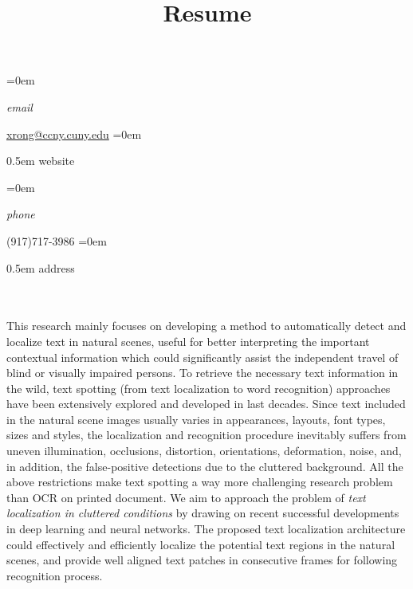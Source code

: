 \documentclass{scrartcl}
\date{}
\title{Resume}
\newlength{\datebox}\settowidth{\datebox}{Spring 2014} %
\newcommand{\NewEntry}[3]{\noindent\hangindent=0em\hangafter=0 \parbox{\datebox}{\small \textit{#1}}\hspace{1.5em} #2 #3 %
\vspace{0.5em}} %
\begin{document}
\thispagestyle{empty} %


\begin{cv}{}\vspace{2.0em} %


\NewEntry{email}{\href{mailto:xrong@ccny.cuny.edu}{xrong@ccny.cuny.edu}} %

\NewEntry{website}{\href{http://xrong.org}{http://xrong.org}} %

\NewEntry{phone}{(917)717-3986} %

\NewEntry{address}{Steinman Hall ST512, 160 Convent Avenue, New York, NY 10031} %

\vspace{2.0em} %

\noindent{}\vspace{0.5em}\\
\noindent{}\vspace{0.5em}\\


This research mainly focuses on developing a method to automatically detect and localize text in natural scenes, useful for better interpreting the important contextual information which could significantly assist the independent travel of blind or visually impaired persons. To retrieve the necessary text information in the wild, text spotting (from text localization to word recognition) approaches have been extensively explored and developed in last decades. Since text included in the natural scene images usually varies in appearances, layouts, font types, sizes and styles, the localization and recognition procedure inevitably suffers from uneven illumination, occlusions, distortion, orientations, deformation, noise, and, in addition, the false-positive detections due to the cluttered background. All the above restrictions make text spotting a way more challenging research problem than OCR on printed document. We aim to approach the problem of \textit{text localization in cluttered conditions} by drawing on recent successful developments in deep learning and neural networks. The proposed text localization architecture could effectively and efficiently localize the potential text regions in the natural scenes, and provide well aligned text patches in consecutive frames for following recognition process.


\end{cv}
\end{document}
